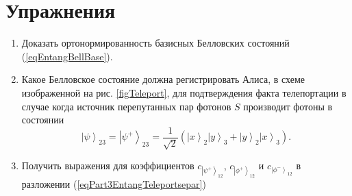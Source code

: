 















\section{Упражнения}
\begin{enumerate}
\item Доказать ортонормированность базисных Белловских состояний
  (\ref{eqEntangBellBase}). 
\item Какое Белловское состояние должна регистрировать Алиса, в схеме
  изображенной на рис. \ref{figTeleport}, для
  подтверждения факта телепортации в случае когда источник
  перепутанных пар фотонов $S$ производит фотоны в состоянии 
\begin{equation}
  \left|\psi\right>_{23} = \left|\psi^{+}\right>_{23} = \frac{1}{\sqrt{2}}\left(
  \left|x\right>_2\left|y\right>_3 +
  \left|y\right>_2\left|x\right>_3
  \right).
  \nonumber
\end{equation}
\item Получить выражения для коэффициентов 
$c_{\left|\psi^{+}\right>_{12}}$, 
$c_{\left|\phi^{+}\right>_{12}}$ и 
$c_{\left|\phi^{-}\right>_{12}}$
в разложении (\ref{eqPart3EntangTeleportsepar})
\end{enumerate}

